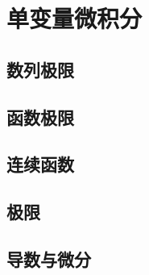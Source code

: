 \part{单变量微积分}

\chapter{数列极限}








\chapter{函数极限}









\chapter{连续函数}




\chapter{极限}
% 

% 
% 
% 



\chapter{导数与微分}\label{chapter:导数}








